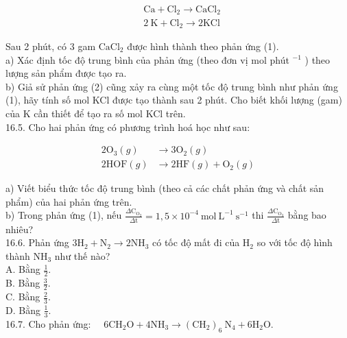 \documentclass[10pt]{article}
\begin{document}
\begin{align*}
& \mathrm{Ca}+\mathrm{Cl}_{2} \rightarrow \mathrm{CaCl}_{2}  \tag{1}\\
& 2 \mathrm{~K}+\mathrm{Cl}_{2} \rightarrow 2 \mathrm{KCl} \tag{2}
\end{align*}


Sau 2 phút, có 3 gam $\mathrm{CaCl}_{2}$ được hình thành theo phản ứng (1).\\
a) Xác định tốc độ trung bình của phản ứng (theo đơn vị mol phút ${ }^{-1}$ ) theo lượng sản phẩm được tạo ra.\\
b) Giả sử phản ứng (2) cũng xảy ra cùng một tốc độ trung bình như phản ứng (1), hãy tính số mol KCl được tạo thành sau 2 phút. Cho biết khối lượng (gam) của K cần thiết để tạo ra số mol KCl trên.\\
16.5. Cho hai phản ứng có phương trình hoá học như sau:


\begin{align*}
2 \mathrm{O}_{3}(g) & \rightarrow 3 \mathrm{O}_{2}(g)  \tag{1}\\
2 \mathrm{HOF}(g) & \rightarrow 2 \mathrm{HF}(g)+\mathrm{O}_{2}(g) \tag{2}
\end{align*}


a) Viết biểu thức tốc độ trung bình (theo cả các chất phản ứng và chất sản phẩm) của hai phản ứng trên.\\
b) Trong phản ứng (1), nếu $\frac{\Delta \mathrm{C}_{\mathrm{O}_{2}}}{\Delta \mathrm{t}}=1,5 \times 10^{-4} \mathrm{~mol} \mathrm{~L}^{-1} \mathrm{~s}^{-1}$ thi $\frac{\Delta \mathrm{C}_{\mathrm{O}_{3}}}{\Delta \mathrm{t}}$ bằng bao nhiêu?\\
16.6. Phản ứng $3 \mathrm{H}_{2}+\mathrm{N}_{2} \rightarrow 2 \mathrm{NH}_{3}$ có tốc độ mất đi của $\mathrm{H}_{2}$ so với tốc độ hình thành $\mathrm{NH}_{3}$ như thế nào?\\
A. Bằng $\frac{1}{2}$.\\
B. Bằng $\frac{3}{2}$.\\
C. Bằng $\frac{2}{3}$.\\
D. Bằng $\frac{1}{3}$.\\
16.7. Cho phản ứng: $\quad 6 \mathrm{CH}_{2} \mathrm{O}+4 \mathrm{NH}_{3} \rightarrow\left(\mathrm{CH}_{2}\right)_{6} \mathrm{~N}_{4}+6 \mathrm{H}_{2} \mathrm{O}$.
\end{document}
